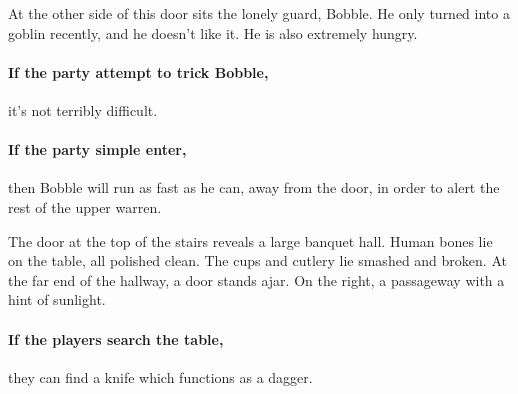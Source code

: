 \iftoggle{hardcore}{
	\section{The Top Floor}
}{
	\chapter{The Top Floor}
	\section{Quiet Rooms}
}
\label{upper}

\setcounter{list}{0}

\begin{multicols}{2}



At the other side of this door sits the lonely guard, Bobble.
He only turned into a goblin recently, and he doesn't like it.
He is also extremely hungry.

\paragraph{If the party attempt to trick Bobble,}
it's not terribly difficult.

\paragraph{If the party simple enter,}
then Bobble will run as fast as he can, away from the door, in order to alert the rest of the upper warren.



\begin{boxtext}

	The door at the top of the stairs reveals a large banquet hall.
	Human bones lie on the table, all polished clean.
	The cups and cutlery lie smashed and broken.
	At the far end of the hallway, a door stands ajar.
	On the right, a passageway with a hint of sunlight.

\end{boxtext}

\paragraph{If the players search the table,}
they can find a knife which functions as a dagger.


\end{multicols}
